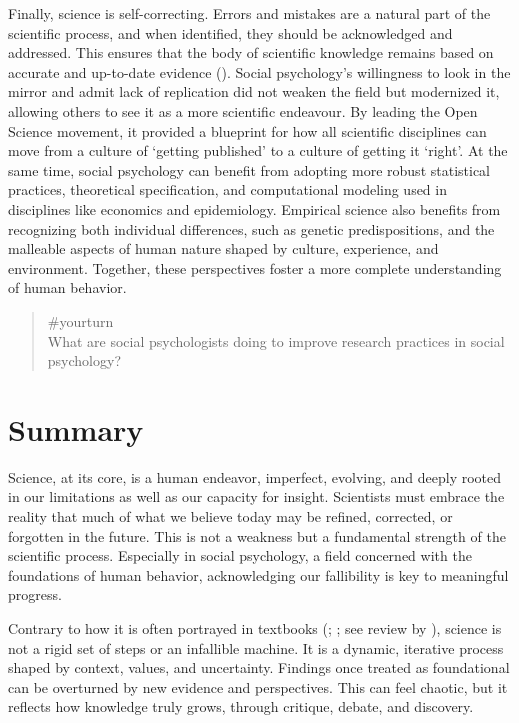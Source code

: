 \documentclass[
  letterpaper,
]{book}
\begin{document}
Finally, science is self-correcting. Errors and mistakes are a natural
part of the scientific process, and when identified, they should be
acknowledged and addressed. This ensures that the body of scientific
knowledge remains based on accurate and up-to-date evidence
(). Social
psychology's willingness to look in the mirror and admit lack of
replication did not weaken the field but modernized it, allowing others
to see it as a more scientific endeavour. By leading the Open Science
movement, it provided a blueprint for how all scientific disciplines can
move from a culture of `getting published' to a culture of getting it
`right'. At the same time, social psychology can benefit from adopting
more robust statistical practices, theoretical specification, and
computational modeling used in disciplines like economics and
epidemiology. Empirical science also benefits from recognizing both
individual differences, such as genetic predispositions, and the
malleable aspects of human nature shaped by culture, experience, and
environment. Together, these perspectives foster a more complete
understanding of human behavior.

\begin{quote}
{\#yourturn}\\
What are social psychologists doing to improve research practices in
social psychology?
\end{quote}

\section*{Summary}\label{summary}


Science, at its core, is a human endeavor, imperfect, evolving, and
deeply rooted in our limitations as well as our capacity for insight.
Scientists must embrace the reality that much of what we believe today
may be refined, corrected, or forgotten in the future. This is not a
weakness but a fundamental strength of the scientific process.
Especially in social psychology, a field concerned with the foundations
of human behavior, acknowledging our fallibility is key to meaningful
progress.

Contrary to how it is often portrayed in textbooks
(;
;
see review by ),
science is not a rigid set of steps or an infallible machine. It is a
dynamic, iterative process shaped by context, values, and uncertainty.
Findings once treated as foundational can be overturned by new evidence
and perspectives. This can feel chaotic, but it reflects how knowledge
truly grows, through critique, debate, and discovery.
\end{document}
